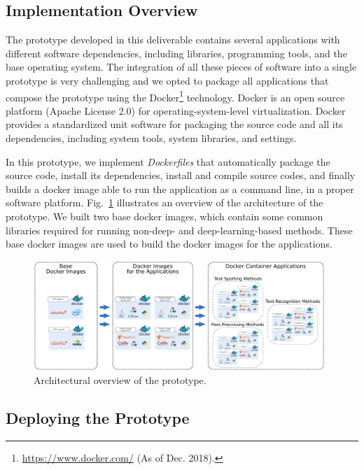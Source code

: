 \subsection{Implementation Overview}
\label{sec:implementation}


The prototype developed in this deliverable contains several applications with different software dependencies, including libraries, programming tools, and the base operating system. The integration of all these pieces of software into a single prototype is very challenging and we opted to package all applications that compose the prototype using the Docker\footnote{\url{https://www.docker.com/} (As of Dec. 2018).} technology. Docker is an open source platform (Apache License 2.0) for operating-system-level virtualization. Docker provides a standardized unit software for packaging the source code and all its dependencies, including system tools, system libraries, and settings.

In this prototype, we implement \textit{Dockerfiles} that automatically package the source code, install its dependencies, install and compile source codes, and finally builds a docker image able to run the application as a command line, in a proper software platform. Fig.~\ref{fig:overview-prototype} illustrates an overview of the architecture of the prototype. We built two base docker images, which contain some common libraries required for running non-deep- and deep-learning-based methods. These base docker images are used to build the docker images for the applications.
%
\begin{figure}
    \centering
    \includegraphics[width=0.98\textwidth]{figs/prototype-overview.pdf}
    \caption{Architectural overview of the prototype.}
    \label{fig:overview-prototype}
\end{figure}


\subsection{Deploying the Prototype}
\label{sec:instalation}

